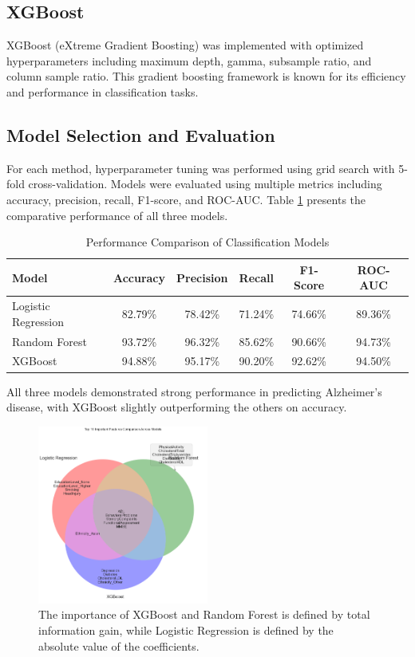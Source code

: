 \documentclass[12pt]{article}
\begin{document}
\subsection{XGBoost}
XGBoost (eXtreme Gradient Boosting) was implemented with optimized hyperparameters including maximum depth, gamma, subsample ratio, and column sample ratio. This gradient boosting framework is known for its efficiency and performance in classification tasks.

\subsection{Model Selection and Evaluation}
For each method, hyperparameter tuning was performed using grid search with 5-fold cross-validation. Models were evaluated using multiple metrics including accuracy, precision, recall, F1-score, and ROC-AUC. Table \ref{tab:model_comparison} presents the comparative performance of all three models.

\begin{table}[H]
    \centering
    \caption{Performance Comparison of Classification Models}
    \label{tab:model_comparison}
    \begin{tabular}{lccccc}
        \toprule
        \textbf{Model} & \textbf{Accuracy} & \textbf{Precision} & \textbf{Recall} & \textbf{F1-Score} & \textbf{ROC-AUC} \\
        \midrule
        Logistic Regression & 82.79\%&78.42\%&71.24\%&74.66\%&89.36\% \\
        Random Forest & 93.72\% & 96.32\% & 85.62\% & 90.66\% & 94.73\% \\
        XGBoost & 94.88\% &95.17\% & 90.20\% & 92.62\% & 94.50\% \\
        \bottomrule
    \end{tabular}
\end{table}

All three models demonstrated strong performance in predicting Alzheimer's disease, with XGBoost slightly outperforming the others on accuracy.

\begin{figure}[H]
    \centering
    \includegraphics[width=0.5\textwidth]{figures/top10features_venns.png}
    \caption{The importance of XGBoost and Random Forest is defined by total information gain, while Logistic Regression is defined by the absolute value of the coefficients.}
    \label{fig:feature_importance}
\end{figure}
\end{document}
